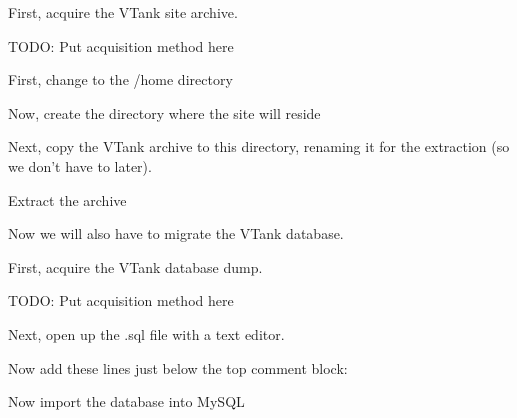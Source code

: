 \vspace{1pc}

First, acquire the VTank site archive.

TODO: Put acquisition method here

\vspace{1pc}

First, change to the /home directory


\vspace{1pc}

Now, create the directory where the site will reside


\vspace{1pc}

Next, copy the VTank archive to this directory, renaming it for the extraction (so we don't have to later).


\vspace{1pc}

Extract the archive


\vspace{1pc}

\vspace{1pc}

Now we will also have to migrate the VTank database.

First, acquire the VTank database dump.

TODO: Put acquisition method here

\vspace{1pc}

Next, open up the .sql file with a text editor.


\vspace{1pc}

Now add these lines just below the top comment block:



\vspace{1pc}

Now import the database into MySQL


\vspace{1pc}

